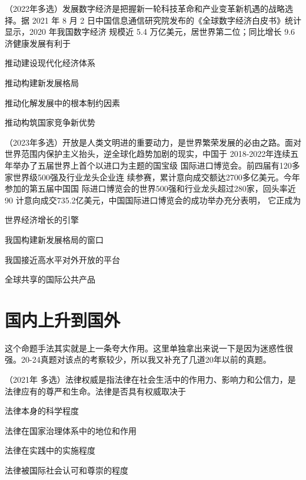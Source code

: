 \documentclass[lang=cn,blue,10pt,scheme=chinese,twocol]{zznote}
\begin{document}
\begin{example}	（2022年多选）发展数字经济是把握新一轮科技革命和产业变革新机遇的战略选择。据 2021 年 8 月 2
	日中国信息通信研究院发布的《全球数字经济白皮书》统计显示，2020 年我国数字经济
	规模近 5.4 万亿美元，居世界第二位；同比增长 9.6%
	济健康发展有利于
	\begin{choice}
		\item 推动建设现代化经济体系
		\item 推动构建新发展格局
		\item 推动化解发展中的根本制约因素
		\item 推动构筑国家竞争新优势
	\end{choice}
\end{example}

\begin{example} （2023年多选）开放是人类文明进的重要动力，是世界繁荣发展的必由之路。面对
	世界范围内保护主义抬头，逆全球化趋势加剧的现实，中国于
	2018-2022年连续五年举办了五届世界上首个以进口为主题的国宝级  国际进口博览会。前四届有120多家世界级500强及行业龙头企业连  续参赛，累计意向成交额达2700多亿美元。今年参加的第五届中国国 际进口博览会的世界500强和行业龙头超过280家，回头率近90%
	计意向成交735.2亿美元，中国国际进口博览会的成功举办充分表明，
	它正成为
	\begin{choice}
		\item 世界经济增长的引擎
		\item 我国构建新发展格局的窗口
		\item 我国接近高水平对外开放的平台
		\item 全球共享的国际公共产品
	\end{choice}
\end{example}



\section{国内上升到国外}
\begin{definition}
	这个命题手法其实就是上一条夸大作用。这里单独拿出来说一下是因为迷惑性很强。20-24真题对该点的考察较少，所以我又补充了几道20年以前的真题。
\end{definition}

\begin{example}
	（2021年 多选）法律权威是指法律在社会生活中的作用力、影响力和公信力，是法律应有的尊严和生命。法律是否具有权威取决于
	\begin{choice}
		\item 法律本身的科学程度
		\item 法律在国家治理体系中的地位和作用
		\item 法律在实践中的实施程度
		\item 法律被国际社会认可和尊崇的程度
	\end{choice}
\end{example}
\end{document}
